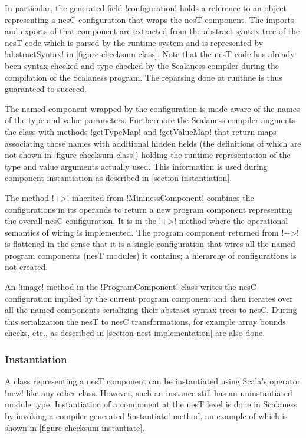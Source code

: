 In particular, the generated field !configuration! holds a reference to an object representing a
nesC configuration that wraps the nesT component. The imports and exports of that component are
extracted from the abstract syntax tree of the nesT code which is parsed by the runtime system
and is represented by !abstractSyntax! in \autoref{figure-checksum-class}. Note that the nesT
code has already been syntax checked and type checked by the Scalaness compiler during the
compilation of the Scalaness program. The reparsing done at runtime is thus guaranteed to
succeed.

The named component wrapped by the configuration is made aware of the names of the type and
value parameters. Furthermore the Scalaness compiler augments the class with methods
!getTypeMap! and !getValueMap! that return maps associating those names with additional hidden
fields (the definitions of which are not shown in \autoref{figure-checksum-class}) holding the
runtime representation of the type and value arguments actually used. This information is used
during component instantiation as described in \autoref{section-instantiation}.

The method !+>! inherited from !MininessComponent! combines the configurations in its operands
to return a new program component representing the overall nesC configuration. It is in the !+>!
method where the operational semantics of wiring is implemented. The program component returned
from !+>! is flattened in the sense that it is a single configuration that wires all the named
program components (nesT modules) it contains; a hierarchy of configurations is not created.

An !image! method in the !ProgramComponent! class writes the nesC configuration implied by the
current program component and then iterates over all the named components serializing their
abstract syntax trees to nesC. During this serialization the nesT to nesC transformations, for
example array bounds checks, etc., as described in \autoref{section-nest-implementation} are
also done.

\subsubsection{Instantiation}
\label{section-instantiation}

A class representing a nesT component can be instantiated using Scala's operator !new! like any
other class. However, such an instance still has an uninstantiated module type. Instantiation of
a component at the nesT level is done in Scalaness by invoking a compiler generated
!instantiate! method, an example of which is shown in \autoref{figure-checksum-instantiate}.

